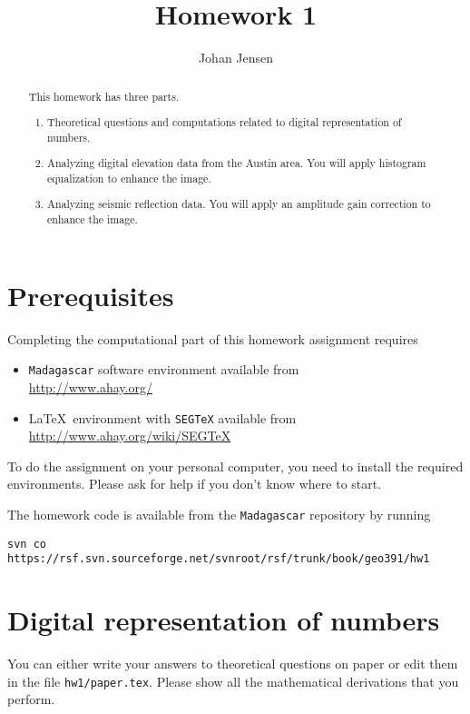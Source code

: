 \author{Johan Jensen}
\title{Homework 1}

\begin{abstract}
  This homework has three parts. 
  \begin{enumerate}
  \item Theoretical questions and computations related to digital representation of numbers.
  \item Analyzing digital elevation data from the Austin area. You will apply 
  histogram equalization to enhance the image.
  \item Analyzing seismic reflection data. You will apply an amplitude gain 
  correction to enhance the image.
  \end{enumerate}
\end{abstract}

\section{Prerequisites}

Completing the computational part of this homework assignment requires
\begin{itemize}
\item \texttt{Madagascar} software environment available from \\
\url{http://www.ahay.org/}
\item \LaTeX\ environment with \texttt{SEGTeX} available from \\ 
\url{http://www.ahay.org/wiki/SEGTeX}
\end{itemize}
To do the assignment on your personal computer, you need to install
the required environments. Please ask for help if you don't know where
to start.

The homework code is available from the \texttt{Madagascar} repository
by running
\begin{verbatim}
svn co https://rsf.svn.sourceforge.net/svnroot/rsf/trunk/book/geo391/hw1
\end{verbatim}

\newpage

\section{Digital representation of numbers}

You can either write your answers to theoretical questions on paper or
edit them in the file \verb#hw1/paper.tex#. Please show all the
mathematical derivations that you perform.

